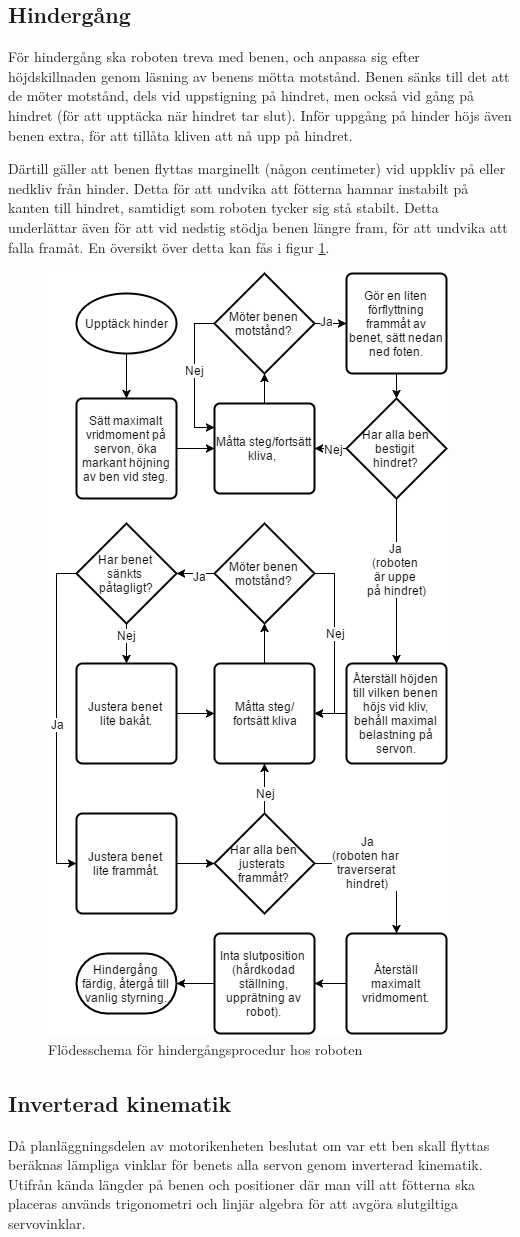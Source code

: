 \documentclass[a4paper,titlepage,12pt]{article}
\begin{document}
	\subsection{Hindergång}
	För hindergång ska roboten treva med benen, och anpassa sig efter höjdskillnaden genom
	läsning av benens mötta motstånd. Benen sänks till det att de möter motstånd, dels
	vid uppstigning på hindret, men också vid gång på hindret (för att upptäcka när hindret 
	tar slut). Inför uppgång på hinder höjs även benen extra, för att tillåta kliven att nå 
	upp på hindret.

	Därtill gäller att benen flyttas marginellt (någon centimeter) vid uppkliv på eller 
	nedkliv från hinder. Detta för att undvika att fötterna hamnar instabilt på kanten till 
	hindret, samtidigt som roboten tycker sig stå stabilt. Detta underlättar även för att vid nedstig stödja benen 
	längre fram, för att undvika att falla framåt. En översikt över detta kan fås i figur \ref{fig:walkflow1}.

	\begin{figure}[h!]
		\centering
		\includegraphics[width=0.5\linewidth]{images/hindergang_flowchart.png}
		\caption{Flödesschema för hindergångsprocedur hos roboten \label{fig:walkflow1}}
	\end{figure}

	\subsection{Inverterad kinematik}
	\label{sub:inverterad-kinematik}
	Då planläggningsdelen av motorikenheten beslutat om var ett ben skall flyttas beräknas 
	lämpliga vinklar för benets alla servon genom inverterad kinematik. Utifrån kända 
	längder på benen och positioner där man vill att fötterna ska placeras används 
	trigonometri och linjär algebra för att avgöra slutgiltiga servovinklar.
\end{document}
